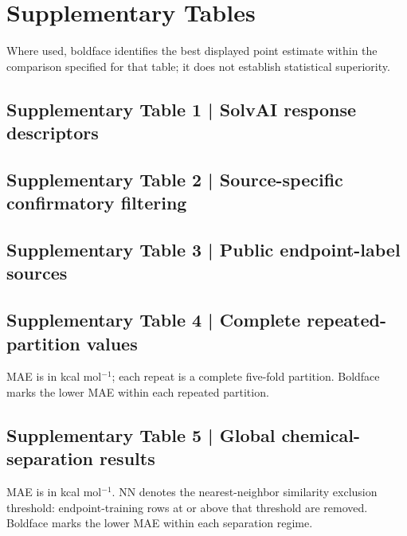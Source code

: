 \clearpage
\section*{Supplementary Tables}
Where used, boldface identifies the best displayed point estimate within the
comparison specified for that table; it does not establish statistical superiority.

\subsection*{Supplementary Table 1 | SolvAI response descriptors}
\small

\normalsize

\subsection*{Supplementary Table 2 | Source-specific confirmatory filtering}
\small
\resizebox{\textwidth}{!}{}
\normalsize

\subsection*{Supplementary Table 3 | Public endpoint-label sources}
\small

\normalsize

\subsection*{Supplementary Table 4 | Complete repeated-partition values}
\small
MAE is in kcal mol$^{-1}$; each repeat is a complete five-fold partition.
Boldface marks the lower MAE within each repeated partition.
\par\smallskip\noindent

\normalsize

\subsection*{Supplementary Table 5 | Global chemical-separation results}
\small
MAE is in kcal mol$^{-1}$. NN denotes the nearest-neighbor similarity exclusion
threshold: endpoint-training rows at or above that threshold are removed.
Boldface marks the lower MAE within each separation regime.
\par\smallskip\noindent

\normalsize

